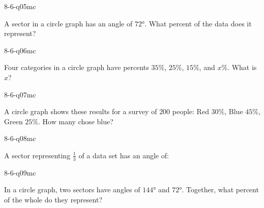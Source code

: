 \begin{practiceQuestion}{8-6-q05}{mc}
\begin{questionText}
A sector in a circle graph has an angle of $72°$. What percent of the data does it represent?
\end{questionText}
\end{practiceQuestion}

\begin{practiceQuestion}{8-6-q06}{mc}
\begin{questionText}
Four categories in a circle graph have percents $35\%$, $25\%$, $15\%$, and $x\%$. What is $x$?
\end{questionText}
\end{practiceQuestion}

\begin{practiceQuestion}{8-6-q07}{mc}
\begin{questionText}
A circle graph shows these results for a survey of $200$ people: Red $30\%$, Blue $45\%$, Green $25\%$. How many chose blue?
\end{questionText}
\end{practiceQuestion}

\begin{practiceQuestion}{8-6-q08}{mc}
\begin{questionText}
A sector representing $\frac{1}{3}$ of a data set has an angle of:
\end{questionText}
\end{practiceQuestion}

\begin{practiceQuestion}{8-6-q09}{mc}
\begin{questionText}
In a circle graph, two sectors have angles of $144°$ and $72°$. Together, what percent of the whole do they represent?
\end{questionText}
\end{practiceQuestion}

